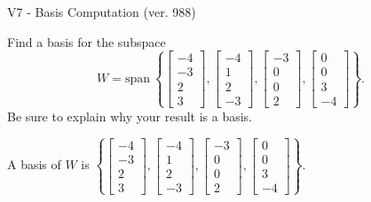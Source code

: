 \begin{exercise}
  \begin{exerciseTitle}V7 - Basis Computation (ver. 988)\end{exerciseTitle}
  \begin{exerciseStatement}
    Find a basis for the subspace 
\[W=\mathrm{span}\ \left\{\left[\begin{array}{r}
-4 \\
-3 \\
2 \\
3
\end{array}\right] , \left[\begin{array}{r}
-4 \\
1 \\
2 \\
-3
\end{array}\right] , \left[\begin{array}{r}
-3 \\
0 \\
0 \\
2
\end{array}\right] , \left[\begin{array}{r}
0 \\
0 \\
3 \\
-4
\end{array}\right]\right\}.\]
 Be sure to explain why your result is a basis.


  \end{exerciseStatement}
  \begin{exerciseAnswer}
   A basis of \(W\) is  \(\left\{\left[\begin{array}{r}
-4 \\
-3 \\
2 \\
3
\end{array}\right] , \left[\begin{array}{r}
-4 \\
1 \\
2 \\
-3
\end{array}\right] , \left[\begin{array}{r}
-3 \\
0 \\
0 \\
2
\end{array}\right] , \left[\begin{array}{r}
0 \\
0 \\
3 \\
-4
\end{array}\right]\right\}\).
  


  \end{exerciseAnswer}
\end{exercise}